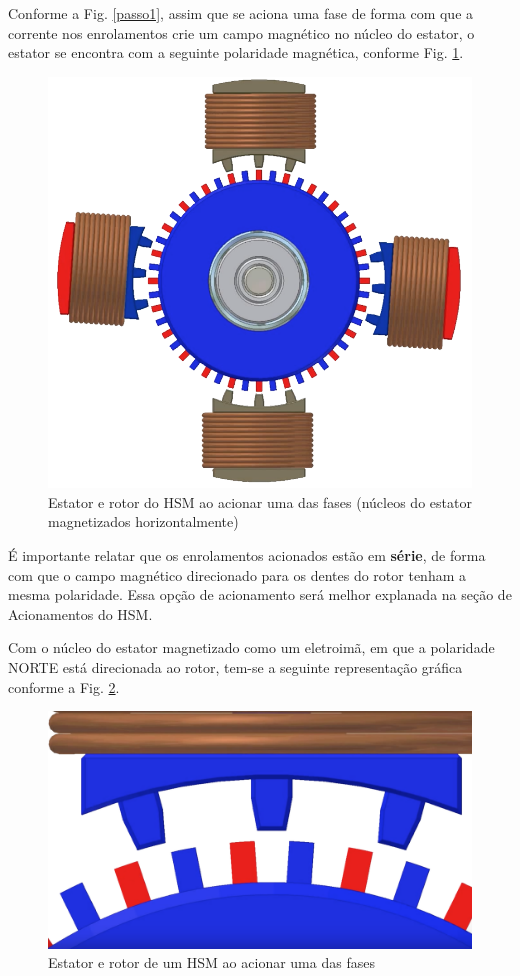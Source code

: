 	Conforme a Fig. \ref{passo1}, assim que se aciona uma fase de forma com que a corrente nos enrolamentos crie um campo magnético no núcleo do estator, o estator se encontra com a seguinte polaridade magnética, conforme Fig. \ref{acionamento1}.
	
	\begin{figure}[!h]
		\centering 
		\includegraphics[scale=0.3]{images/hsm_operation/etapa3}
		\caption{Estator e rotor do HSM ao acionar uma das fases (núcleos do estator magnetizados horizontalmente)}
		\label{acionamento1}
	\end{figure}
	
	É importante relatar que os enrolamentos acionados estão em \textbf{série}, de forma com que o campo magnético direcionado para os dentes do rotor tenham a mesma polaridade. Essa opção de acionamento será melhor explanada na seção de Acionamentos do HSM.
	
	Com o núcleo do estator magnetizado como um eletroimã, em que a polaridade NORTE está direcionada ao rotor, tem-se a seguinte representação gráfica conforme a Fig. \ref{passo2}.
	
	\begin{figure}[!h]
		\centering 
		\includegraphics[scale=0.16]{images/hsm_operation/visaopasso2}
		\caption{Estator e rotor de um HSM ao acionar uma das fases}
		\label{passo2}
	\end{figure}
	
